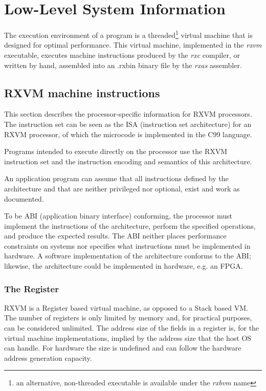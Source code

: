 \chapter{Low-Level System Information}
The execution environment of a \crexx{} program is a
threaded\footnote{an alternative, non-threaded executable is available
  under the \emph{rxbvm} name} virtual
machine that is designed for optimal performance. This virtual
machine, implemented in the \emph{rxvm} executable, executes
machine instructions produced by the \emph{rxc} \crexx{}
compiler, or written by hand, assembled into an .rxbin binary file by
the \emph{rxas} assembler.



\section{RXVM machine instructions}

This section describes the processor-specific information for
RXVM processors. The instruction set can be seen as the ISA
(instruction set architecture) for
an RXVM processor, of which the microcode is implemented in the C99 language.

Programs intended to execute directly on the processor use the
RXVM instruction set and the
instruction encoding and semantics of this architecture.

An application program can assume that all instructions defined by the
architecture and that are neither privileged nor optional, exist and work
as documented.

To be ABI (application binary interface) conforming, the processor must implement the instructions of
the architecture, perform the specified operations, and produce the
expected results.  The ABI neither places performance constraints on
systems nor specifies what instructions must be implemented in
hardware.  A software implementation of the architecture conforms to
the ABI; likewise, the architecture could be implemented in hardware,
e.g. an FPGA.

\subsection{The Register}
RXVM is a Register based virtual machine, as opposed to a Stack based
VM. The number of registers is only limited by memory and, for
practical purposes, can be considered unlimited. The address size of
the fields in a register is, for the virtual machine implementations,
implied by the address size that the host OS can handle. For hardware
the size is undefined and can follow the hardware address generation
capacity.

